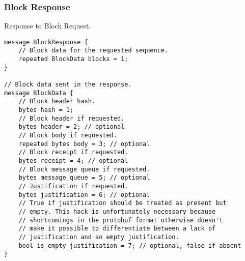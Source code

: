 \documentclass{book}
\begin{document}
\subsubsection{Block Response}

Response to Block Request.

\begin{lstlisting}[frame=single]
message BlockResponse {
    // Block data for the requested sequence.
    repeated BlockData blocks = 1;
} 

// Block data sent in the response.
message BlockData {
    // Block header hash.
    bytes hash = 1;
    // Block header if requested.
    bytes header = 2; // optional
    // Block body if requested.
    repeated bytes body = 3; // optional
    // Block receipt if requested.
    bytes receipt = 4; // optional
    // Block message queue if requested.
    bytes message_queue = 5; // optional
    // Justification if requested.
    bytes justification = 6; // optional
    // True if justification should be treated as present but
    // empty. This hack is unfortunately necessary because 
    // shortcomings in the protobuf format otherwise doesn't
    // make it possible to differentiate between a lack of 
    // justification and an empty justification.
    bool is_empty_justification = 7; // optional, false if absent
}
\end{lstlisting}
\end{document}
